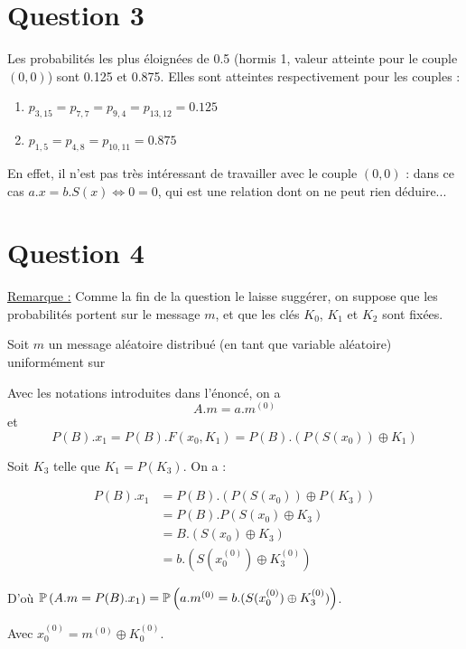 \section*{Question 3}

Les probabilités les plus éloignées de 0.5 (hormis 1, valeur atteinte pour le couple $(0,0)$) sont 0.125 et 0.875.
Elles sont atteintes respectivement pour les couples :
\begin{enumerate}
\item $p_{3,15} = p_{7,7} = p_{9,4} = p_{13,12} = 0.125$
\item $p_{1,5} = p_{4,8} = p_{10,11} = 0.875$
\end{enumerate}

En effet, il n'est pas très intéressant de travailler avec le couple $(0,0)$ : dans ce cas $a.x = b.S(x) \Leftrightarrow 0 = 0$, qui est une relation dont on ne peut rien déduire...

\section*{Question 4}

\underline{Remarque :} Comme la fin de la question le laisse suggérer, on suppose que les probabilités portent sur le message $m$, et que les clés $K_0$, $K_1$ et $K_2$ sont fixées.

Soit $m$ un message aléatoire distribué (en tant que variable aléatoire) uniformément sur %

Avec les notations introduites dans l'énoncé, on a \[A.m = a.m^{(0)}\] et \[P(B).x_1 = P(B).F(x_0,K_1) = P(B).\left( P \left( S(x_0) \right) \oplus K_1 \right)\]

Soit $K_3$ telle que $K_1 = P(K_3)$. On a :


\[
    \begin{aligned}
        P(B).x_1 &= P(B).\left (P\left (S\left (x_0\right )\right )\oplus P(K_3)\right ) \\
        &= P\left (B\right ).P\left (S\left (x_0\right ) \oplus K_3\right )\\
        &= B.\left (S\left (x_0\right ) \oplus K_3\right ) \\
        &= b.\left (S\left (x_0^{\left (0\right )}\right ) \oplus K_3^{(0)}\right )
    \end{aligned}
\]

D'où $\mathbb{P}\left( A.m = P(B).x_1 \right) = \mathbb{P}\left( a.m^{(0)}= b.(S(x_0^{(0)}) \oplus K_3^{(0)}) \right)$.

Avec $x_0^{(0)} = m^{(0)} \oplus K_0^{(0)}$.

